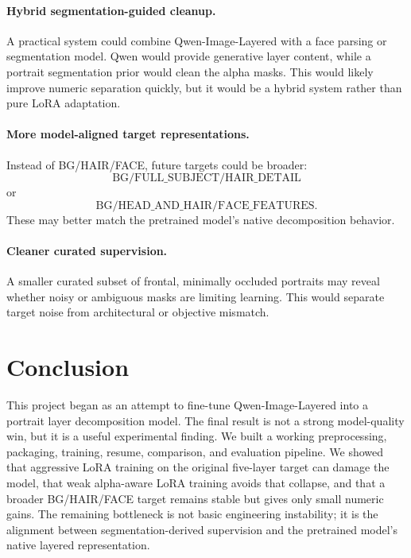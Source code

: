 \documentclass[11pt]{article}
\begin{document}
\paragraph{Hybrid segmentation-guided cleanup.}
A practical system could combine Qwen-Image-Layered with a face parsing or
segmentation model. Qwen would provide generative layer content, while a portrait
segmentation prior would clean the alpha masks. This would likely improve numeric
separation quickly, but it would be a hybrid system rather than pure LoRA
adaptation.

\paragraph{More model-aligned target representations.}
Instead of BG/HAIR/FACE, future targets could be broader:
\[
\mathrm{BG}/\mathrm{FULL\_SUBJECT}/\mathrm{HAIR\_DETAIL}
\]
or
\[
\mathrm{BG}/\mathrm{HEAD\_AND\_HAIR}/\mathrm{FACE\_FEATURES}.
\]
These may better match the pretrained model's native decomposition behavior.

\paragraph{Cleaner curated supervision.}
A smaller curated subset of frontal, minimally occluded portraits may reveal
whether noisy or ambiguous masks are limiting learning. This would separate target
noise from architectural or objective mismatch.

\section{Conclusion}

This project began as an attempt to fine-tune Qwen-Image-Layered into a portrait
layer decomposition model. The final result is not a strong model-quality win, but
it is a useful experimental finding. We built a working preprocessing, packaging,
training, resume, comparison, and evaluation pipeline. We showed that aggressive
LoRA training on the original five-layer target can damage the model, that weak
alpha-aware LoRA training avoids that collapse, and that a broader BG/HAIR/FACE
target remains stable but gives only small numeric gains.
The remaining bottleneck is not basic engineering instability; it is the alignment
between segmentation-derived supervision and the pretrained model's native layered
representation.
\end{document}
